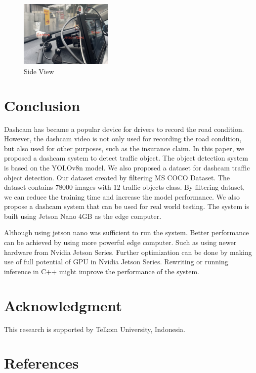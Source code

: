 \documentclass[conference]{IEEEtran}
\begin{document}
\begin{figure}[h]
    \centering
    \includegraphics[width=0.4\textwidth,keepaspectratio]{mounted_camera_side_view.jpg}
    \caption{Side View}
    \label{fig:side_view}
\end{figure}



\section{Conclusion}
Dashcam has became a popular device for drivers to record the road condition. However, the dashcam video is not only used for recording the road condition, but also used for other purposes, such as the insurance claim. 
In this paper, we proposed a dashcam system to detect traffic object. The object detection system is based on the YOLOv8n model. We also proposed a dataset for dashcam traffic object detection. Our dataset created by filtering MS COCO Dataset. The dataset contains 78000 images with 12 traffic objects class.
By filtering dataset, we can reduce the training time and increase the model performance.
We also propose a dashcam system that can be used for real world testing. The system is built using Jetson Nano 4GB as the edge computer.


Although using jetson nano was sufficient to run the system. Better performance can be achieved by using more powerful edge computer. Such as using newer hardware from Nvidia Jetson Series. Further optimization can be done by making use of full potential of GPU in Nvidia Jetson Series. Rewriting or running inference in C++ might improve the performance of the system.

\section*{Acknowledgment}

This research is supported by Telkom University, Indonesia.

\section*{References}
\end{document}
